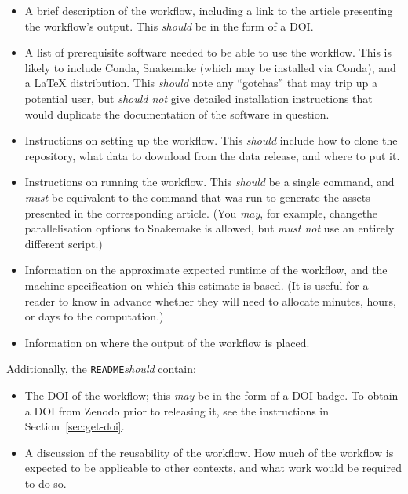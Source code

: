 \documentclass{article}
\newcommand\rfcword[1]{\emph{#1}\xspace}
\newcommand\must{\rfcword{must}}
\newcommand\mustnot{\rfcword{must not}}
\newcommand\should{\rfcword{should}}
\newcommand\shouldnot{\rfcword{should not}}
\newcommand\may{\rfcword{may}}
\newcommand\filename[1]{\texttt{#1}\xspace}
\newcommand\readme{\filename{README}\xspace}
\begin{document}
\begin{itemize}
  \item
        A brief description of the workflow,
        including a link to the article presenting the workflow's output.
        This \should be in the form of a DOI\@.
  \item
        A list of prerequisite software needed to be able to use the workflow.
        This is likely to include
        Conda,
        Snakemake
        (which may be installed via Conda),
        and a LaTeX distribution.
        This \should note any ``gotchas'' that may trip up a potential user,
        but \shouldnot give detailed installation instructions
        that would duplicate the documentation of the software in question.
  \item
        Instructions on setting up the workflow.
        This \should include how to clone the repository,
        what data to download from the data release,
        and where to put it.
  \item
        Instructions on running the workflow.
        This \should be a single command,
        and \must be equivalent to the command that was run
        to generate the assets presented in the corresponding article.
        (You \may,
        for example,
        changethe parallelisation options to Snakemake is allowed,
        but \mustnot use an entirely different script.)
  \item
        Information on the approximate expected runtime of the workflow,
        and the machine specification on which this estimate is based.
        (It is useful for a reader to know in advance
        whether they will need to allocate
        minutes,
        hours,
        or days
        to the computation.)
  \item
        Information on where the output of the workflow is placed.
\end{itemize}

Additionally,
the \readme \should contain:

\begin{itemize}
  \item
        The DOI of the workflow;
        this \may be in the form of a DOI badge.
        To obtain a DOI from Zenodo prior to releasing it,
        see the instructions in Section~\ref{sec:get-doi}.
  \item
        A discussion of the reusability of the workflow.
        How much of the workflow is expected to be applicable to other contexts,
        and what work would be required to do so.
\end{itemize}
\end{document}

